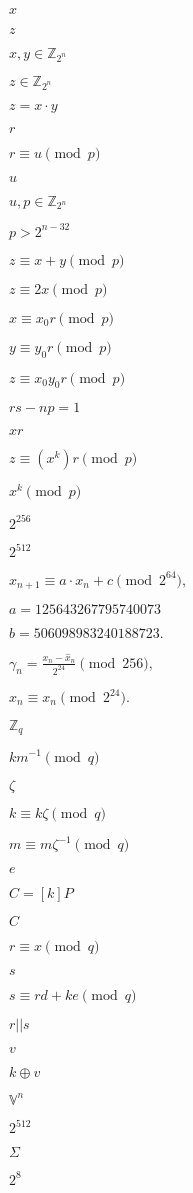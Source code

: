 \documentclass{article}
\begin{document}
$ x$
\pagebreak

$ z $
\pagebreak

$ x, y \in \mathbb Z_{2^n} $
\pagebreak

$ z \in \mathbb Z_{2^n} $
\pagebreak

$ z = x\cdot y$
\pagebreak

$ r $
\pagebreak

$ r \equiv u \pmod{p}$
\pagebreak

$ u $
\pagebreak

$ u, p \in \mathbb Z_{2^n}$
\pagebreak

$ p > 2^{n-32}$
\pagebreak

$ z \equiv x + y \pmod{p}$
\pagebreak

$ z \equiv 2x \pmod{p}$
\pagebreak

$ x \equiv x_0r \pmod{p} $
\pagebreak

$ y \equiv y_0r \pmod{p} $
\pagebreak

$ z \equiv x_0y_0r \pmod{p}$
\pagebreak

$ rs - np = 1$
\pagebreak

$ xr $
\pagebreak

$z \equiv (x^k)r \pmod{p}$
\pagebreak

$ x^k \pmod{p}$
\pagebreak

$2^{256}$
\pagebreak

$2^{512}$
\pagebreak

$ x_{n+1} \equiv a\cdot x_n + c \pmod{2^{64}}, $
\pagebreak

$ a = 125643267795740073 $
\pagebreak

$ b = 506098983240188723. $
\pagebreak

$ \gamma_n = \displaystyle\frac{x_n - \hat x_n}{2^{24}} \pmod{256}, $
\pagebreak

$\hat x_n \equiv x_n \pmod{2^{24}}. $
\pagebreak

$ \mathbb Z_q$
\pagebreak

$ km^{-1} \pmod{q} $
\pagebreak

$ \zeta $
\pagebreak

$ k \equiv k\zeta \pmod{q} $
\pagebreak

$ m \equiv m\zeta^{-1} \pmod{q} $
\pagebreak

$ e $
\pagebreak

$ C = [k]P$
\pagebreak

$ C $
\pagebreak

$ r \equiv x \pmod{q}$
\pagebreak

$ s $
\pagebreak

$ s \equiv rd + ke \pmod{q}$
\pagebreak

$ r||s $
\pagebreak

$ v $
\pagebreak

$ k \oplus v $
\pagebreak

$ \mathbb V^n $
\pagebreak

$ 2^{512} $
\pagebreak

$ \Sigma $
\pagebreak

$ 2^8 $
\pagebreak
\end{document}
